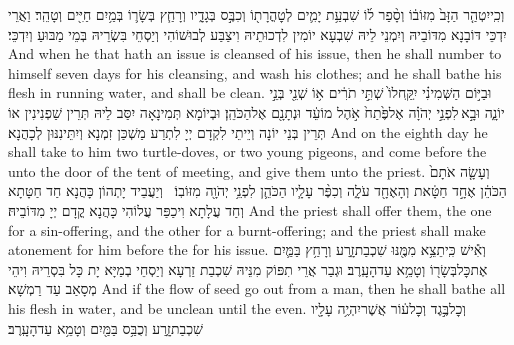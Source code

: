 {וְכִֽי\maqqaf יִטְהַ֤ר הַזָּב֙ מִזּוֹב֔וֹ וְסָ֨פַר ל֜וֹ שִׁבְעַ֥ת יָמִ֛ים לְטׇהֳרָת֖וֹ וְכִבֶּ֣ס בְּגָדָ֑יו וְרָחַ֧ץ בְּשָׂר֛וֹ בְּמַ֥יִם חַיִּ֖ים וְטָהֵֽר׃}
{וַאֲרֵי יִדְכֵּי דּוֹבָנָא מִדּוֹבֵיהּ וְיִמְנֵי לֵיהּ שִׁבְעָא יוֹמִין לִדְכוּתֵיהּ וִיצַבַּע לְבוּשׁוֹהִי וְיַסְחֵי בִּשְׂרֵיהּ בְּמֵי מַבּוּעַ וְיִדְכֵּי׃}
{And when he that hath an issue is cleansed of his issue, then he shall number to himself seven days for his cleansing, and wash his clothes; and he shall bathe his flesh in running water, and shall be clean.}{}
{וּבַיּ֣וֹם הַשְּׁמִינִ֗י יִֽקַּֽח\maqqaf לוֹ֙ שְׁתֵּ֣י תֹרִ֔ים א֥וֹ שְׁנֵ֖י בְּנֵ֣י יוֹנָ֑ה וּבָ֣א \legarmeh  לִפְנֵ֣י יְהֹוָ֗ה אֶל\maqqaf פֶּ֙תַח֙ אֹ֣הֶל מוֹעֵ֔ד וּנְתָנָ֖ם אֶל\maqqaf הַכֹּהֵֽן׃}
{וּבְיוֹמָא תְּמִינָאָה יִסַּב לֵיהּ תְּרֵין שַׁפְנִינִין אוֹ תְּרֵין בְּנֵי יוֹנָה וְיֵיתֵי לִקְדָם יְיָ לִתְרַע מַשְׁכַּן זִמְנָא וְיִתֵּינִנּוּן לְכָהֲנָא׃}
{And on the eighth day he shall take to him two turtle-doves, or two young pigeons, and come before the \lord\space unto the door of the tent of meeting, and give them unto the priest.}{}
{וְעָשָׂ֤ה אֹתָם֙ הַכֹּהֵ֔ן אֶחָ֣ד חַטָּ֔את וְהָאֶחָ֖ד עֹלָ֑ה וְכִפֶּ֨ר עָלָ֧יו הַכֹּהֵ֛ן לִפְנֵ֥י יְהֹוָ֖ה מִזּוֹבֽוֹ׃ \setuma }
{וְיַעֲבֵיד יָתְהוֹן כָּהֲנָא חַד חַטָּתָא וְחַד עֲלָתָא וִיכַפַּר עֲלוֹהִי כָּהֲנָא קֳדָם יְיָ מִדּוֹבֵיהּ׃}
{And the priest shall offer them, the one for a sin-offering, and the other for a burnt-offering; and the priest shall make atonement for him before the \lord\space for his issue.}{}
{וְאִ֕ישׁ כִּֽי\maqqaf תֵצֵ֥א מִמֶּ֖נּוּ שִׁכְבַת\maqqaf זָ֑רַע וְרָחַ֥ץ בַּמַּ֛יִם אֶת\maqqaf כׇּל\maqqaf בְּשָׂר֖וֹ וְטָמֵ֥א עַד\maqqaf הָעָֽרֶב׃}
{וּגְבַר אֲרֵי תִפּוֹק מִנֵּיהּ שִׁכְבַת זַרְעָא וְיַסְחֵי בְמַיָּא יָת כָּל בִּסְרֵיהּ וִיהֵי מְסָאַב עַד רַמְשָׁא׃}
{And if the flow of seed go out from a man, then he shall bathe all his flesh in water, and be unclean until the even.}{}
{וְכׇל\maqqaf בֶּ֣גֶד וְכׇל\maqqaf ע֔וֹר אֲשֶׁר\maqqaf יִהְיֶ֥ה עָלָ֖יו שִׁכְבַת\maqqaf זָ֑רַע וְכֻבַּ֥ס בַּמַּ֖יִם וְטָמֵ֥א עַד\maqqaf הָעָֽרֶב׃}
